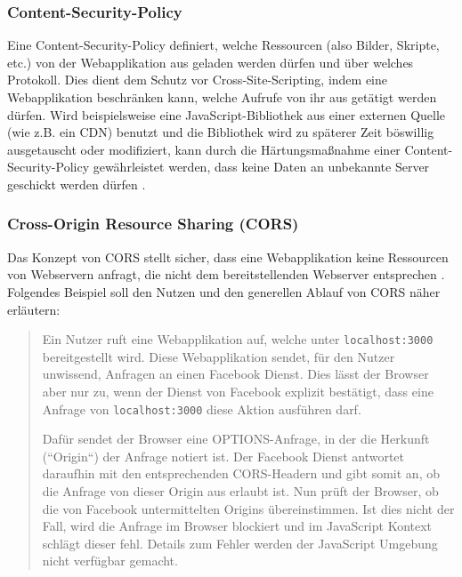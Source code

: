 \subsubsection{Content-Security-Policy}


Eine Content-Security-Policy definiert, welche Ressourcen (also Bilder, Skripte, etc.) von der Webapplikation aus geladen werden dürfen und über welches Protokoll. Dies dient dem Schutz vor Cross-Site-Scripting, indem eine Webapplikation beschränken kann, welche Aufrufe von ihr aus getätigt werden dürfen. Wird beispielsweise eine JavaScript-Bibliothek aus einer externen Quelle (wie z.B. ein CDN) benutzt und die Bibliothek wird zu späterer Zeit böswillig ausgetauscht oder modifiziert, kann durch die Härtungsmaßnahme einer Content-Security-Policy gewährleistet werden, dass keine Daten an unbekannte Server geschickt werden dürfen \cite{MDNContentSecurityPolicy}.

\subsubsection{Cross-Origin Resource Sharing (CORS)}

Das Konzept von CORS stellt sicher, dass eine Webapplikation keine Ressourcen von Webservern anfragt, die nicht dem bereitstellenden Webserver entsprechen \cite{MDNCORS}. Folgendes Beispiel soll den Nutzen und den generellen Ablauf von CORS näher erläutern:

\begin{quotation}
Ein Nutzer ruft eine Webapplikation auf, welche unter \texttt{localhost:3000} bereitgestellt wird. Diese Webapplikation sendet, für den Nutzer unwissend, Anfragen an einen Facebook Dienst. Dies lässt der Browser aber nur zu, wenn der Dienst von Facebook explizit bestätigt, dass eine Anfrage von \texttt{localhost:3000} diese Aktion ausführen darf.

Dafür sendet der Browser eine OPTIONS-Anfrage, in der die Herkunft (``Origin``) der Anfrage notiert ist. Der Facebook Dienst antwortet daraufhin mit den entsprechenden CORS-Headern und gibt somit an, ob die Anfrage von dieser Origin aus erlaubt ist. Nun prüft der Browser, ob die von Facebook untermittelten Origins übereinstimmen. Ist dies nicht der Fall, wird die Anfrage im Browser blockiert und im JavaScript Kontext schlägt dieser fehl. Details zum Fehler werden der JavaScript Umgebung nicht verfügbar gemacht.
\end{quotation}

